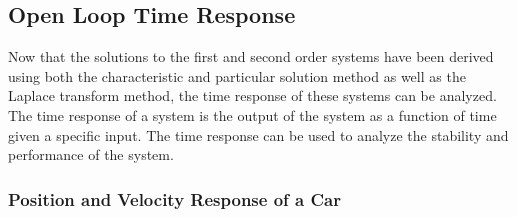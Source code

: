 \subsection{Open Loop Time Response}\label{s:time_response}

Now that the solutions to the first and second order systems have been derived using both the characteristic and particular solution method as well as the Laplace transform method, the time response of these systems can be analyzed. The time response of a system is the output of the system as a function of time given a specific input. The time response can be used to analyze the stability and performance of the system. 

\subsubsection{Position and Velocity Response of a Car}

